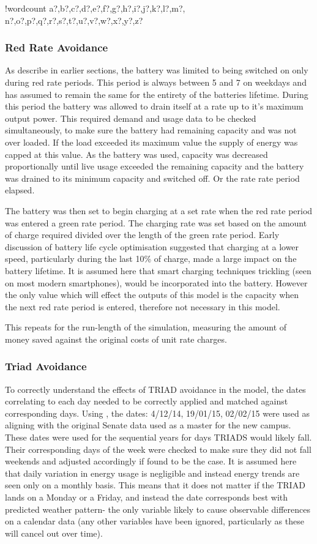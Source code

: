 \documentclass[fontsize=9.5pt]{extarticle}
\numberwithin{figure}{section} %
\newcounter{words}
\newenvironment{counted}{%
  \setcounter{words}{0}
  \SearchList!{wordcount}{\stepcounter{words}}
    {a?,b?,c?,d?,e?,f?,g?,h?,i?,j?,k?,l?,m?,
    n?,o?,p?,q?,r?,s?,t?,u?,v?,w?,x?,y?,z?}
  \UndoBoundary{'}
  \SearchOrder{p;}}{%
  \StopSearching}
\begin{document}
\begin{counted}
\subsubsection{Red Rate Avoidance}\label{red-rate-avoidance}

As describe in earlier sections, the battery was limited to being
switched on only during red rate periods. This period is always between
5 and 7 on weekdays and has assumed to remain the same for the entirety
of the batteries lifetime. During this period the battery was allowed to
drain itself at a rate up to it's maximum output power. This required
demand and usage data to be checked simultaneously, to make sure the
battery had remaining capacity and was not over loaded. If the load
exceeded its maximum value the supply of energy was capped at this
value. As the battery was used, capacity was decreased proportionally
until live usage exceeded the remaining capacity and the battery was
drained to its minimum capacity and switched off. Or the rate rate
period elapsed.

The battery was then set to begin charging at a set rate when the red
rate period was entered a green rate period. The charging rate was set
based on the amount of charge required divided over the length of the
green rate period. Early discussion of battery life cycle optimisation
suggested that charging at a lower speed, particularly during the last
10\% of charge, made a large impact on the battery lifetime. It is
assumed here that smart charging techniques trickling (seen on most
modern smartphones), would be incorporated into the battery. However the
only value which will effect the outputs of this model is the capacity
when the next red rate period is entered, therefore not necessary in
this model.

This repeats for the run-length of the simulation, measuring the amount
of money saved against the original costs of unit rate charges.

\subsubsection{Triad Avoidance}\label{triad-avoidance}

To correctly understand the effects of TRIAD avoidance in the model, the
dates correlating to each day needed to be correctly applied and matched
against corresponding days. Using \autocite{triad15}, the dates:
4/12/14, 19/01/15, 02/02/15 were used as aligning with the original
Senate data used as a master for the new campus. These dates were used
for the sequential years for days TRIADS would likely fall. Their
corresponding days of the week were checked to make sure they did not
fall weekends and adjusted accordingly if found to be the case. It is
assumed here that daily variation in energy usage is negligible and
instead energy trends are seen only on a monthly basis. This means that
it does not matter if the TRIAD lands on a Monday or a Friday, and
instead the date corresponds best with predicted weather pattern- the
only variable likely to cause observable differences on a calendar data
(any other variables have been ignored, particularly as these will
cancel out over time).


\end{counted}
\end{document}
